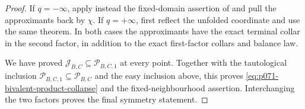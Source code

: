 \begin{proof}
If $q=-\infty$, apply instead the fixed-domain assertion of
 and pull the
approximants back by $\chi$.  If $q=+\infty$, first reflect the unfolded
coordinate and use the same theorem.  In both cases the approximants have
the exact terminal collar in the second factor, in addition to the exact
first-factor collars and balance law.

We have proved $\mathcal J_{B,C}\subseteq\mathcal P_{B,C,1}$ at every
point.  Together with the tautological inclusion
$\mathcal P_{B,C,1}\subseteq\mathcal P_{B,C}$ and the easy inclusion above,
this proves \eqref{eq:p071-bivalent-product-collapse} and the
fixed-neighbourhood assertion.  Interchanging the two factors proves the
final symmetry statement.
\end{proof}
